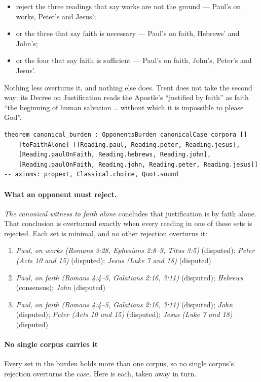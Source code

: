 \documentclass[11pt,paper=\testimonypaper,DIV=13,parskip=false]{scrartcl}
\begin{document}
\begin{itemize}
  \item reject the three readings that say works are not the ground — Paul’s on works, Peter’s and Jesus’;
  \item or the three that say faith is necessary — Paul’s on faith, Hebrews’ and John’s;
  \item or the four that say faith is sufficient — Paul’s on faith, John’s, Peter’s and Jesus’.
\end{itemize}
Nothing less overturns it, and nothing else does. Trent does not take the second way: its Decree on Justification reads the Apostle’s “justified by faith” as faith “the beginning of human salvation … without which it is impossible to please God”.

{\small\begin{verbatim}
theorem canonical_burden : OpponentsBurden canonicalCase corpora []
    [toFaithAlone] [[Reading.paul, Reading.peter, Reading.jesus],
    [Reading.paulOnFaith, Reading.hebrews, Reading.john],
    [Reading.paulOnFaith, Reading.john, Reading.peter, Reading.jesus]]
-- axioms: propext, Classical.choice, Quot.sound
\end{verbatim}}
\paragraph{What an opponent must reject.} \emph{The canonical witness to faith alone} concludes that justification is by faith alone. That conclusion is overturned exactly when every reading in one of these sets is rejected. Each set is minimal, and no other rejection overturns it:
\begin{enumerate}
\item \emph{Paul, on works (Romans 3:28, Ephesians 2:8–9, Titus 3:5)} (disputed); \emph{Peter (Acts 10 and 15)} (disputed); \emph{Jesus (Luke 7 and 18)} (disputed)
\item \emph{Paul, on faith (Romans 4:4–5, Galatians 2:16, 3:11)} (disputed); \emph{Hebrews} (consensus); \emph{John} (disputed)
\item \emph{Paul, on faith (Romans 4:4–5, Galatians 2:16, 3:11)} (disputed); \emph{John} (disputed); \emph{Peter (Acts 10 and 15)} (disputed); \emph{Jesus (Luke 7 and 18)} (disputed)
\end{enumerate}
\paragraph*{No single corpus carries it}
\leavevmode\par\nobreak
Every set in the burden holds more than one corpus, so no single corpus’s rejection overturns the case. Here is each, taken away in turn.
\end{document}
